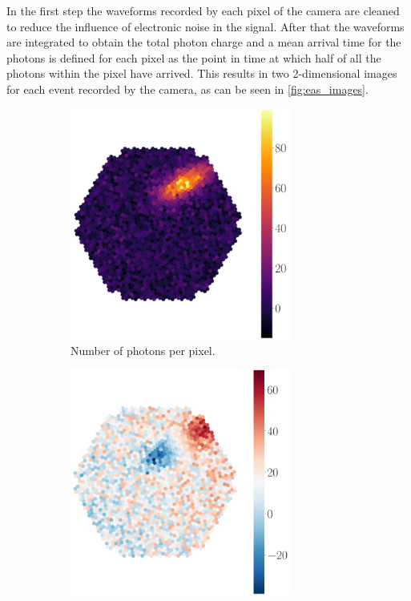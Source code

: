 In the first step the waveforms recorded by each pixel of the camera are cleaned to reduce the influence of electronic noise in the signal.
After that the waveforms are integrated to obtain the total photon charge and a mean arrival time for the photons is defined for each pixel 
as the point in time at which half of all the photons within the pixel have arrived.
This results in two 2-dimensional images for each event recorded by the camera, as can be seen in \autoref{fig:eas_images}.
\begin{figure}
    \centering
    \begin{subfigure}{0.49\textwidth}
        \centering
        \includegraphics[width=0.8\textwidth]{images/eas_image1.png}
        \caption{Number of photons per pixel.}
        \label{fig:eas_image1}
    \end{subfigure}
    \hfill
    \begin{subfigure}{0.49\textwidth}
        \centering
        \includegraphics[width=0.8\textwidth]{images/eas_image2.png}

\end{subfigure}
\end{figure}

